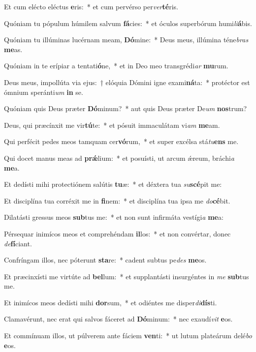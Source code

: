 \item Et cum elécto eléctus \textbf{e}ris:~* et cum pervérso per\textit{ver}\textbf{té}ris.
\item Quóniam tu pópulum húmilem salvum \textbf{fá}cies:~* et óculos superbórum humi\textit{li}\textbf{á}bis.
\item Quóniam tu illúminas lucérnam meam, \textbf{Dó}mine:~* Deus meus, illúmina téne\textit{bras} \textbf{me}as.
\item Quóniam in te erípiar a tentati\textbf{ó}ne,~* et in Deo meo transgrédi\textit{ar} \textbf{mu}rum.
\item Deus meus, impollúta via ejus:~† elóquia Dómini igne exami\textbf{ná}ta:~* protéctor est ómnium speránti\textit{um} \textbf{in} se.
\item Quóniam quis Deus præter \textbf{Dó}minum?~* aut quis Deus præter De\textit{um} \textbf{nos}trum?
\item Deus, qui præcínxit me vir\textbf{tú}te:~* et pósuit immaculátam vi\textit{am} \textbf{me}am.
\item Qui perfécit pedes meos tamquam cer\textbf{vó}rum,~* et super excélsa stá\textit{tu}\textbf{ens} me.
\item Qui docet manus meas ad \textbf{prǽ}lium:~* et posuísti, ut arcum ǽreum, bráchi\textit{a} \textbf{me}a.
\item Et dedísti mihi protectiónem salútis \textbf{tu}æ:~* et déxtera tua \textit{su}\textbf{scé}pit me:
\item Et disciplína tua corréxit me in \textbf{fi}nem:~* et disciplína tua ipsa me \textit{do}\textbf{cé}bit.
\item Dilatásti gressus meos \textbf{sub}tus me:~* et non sunt infirmáta vestígi\textit{a} \textbf{me}a:
\item Pérsequar inimícos meos et comprehéndam \textbf{il}los:~* et non convértar, donec \textit{de}\textbf{fí}ciant.
\item Confríngam illos, nec póterunt \textbf{sta}re:~* cadent subtus pe\textit{des} \textbf{me}os.
\item Et præcinxísti me virtúte ad \textbf{bel}lum:~* et supplantásti insurgéntes in \textit{me} \textbf{sub}tus me.
\item Et inimícos meos dedísti mihi \textbf{dor}sum,~* et odiéntes me disper\textit{di}\textbf{dís}ti.
\item Clamavérunt, nec erat qui salvos fáceret ad \textbf{Dó}minum:~* nec exaudí\textit{vit} \textbf{e}os.
\item Et commínuam illos, ut púlverem ante fáciem \textbf{ven}ti:~* ut lutum plateárum delé\textit{bo} \textbf{e}os.
